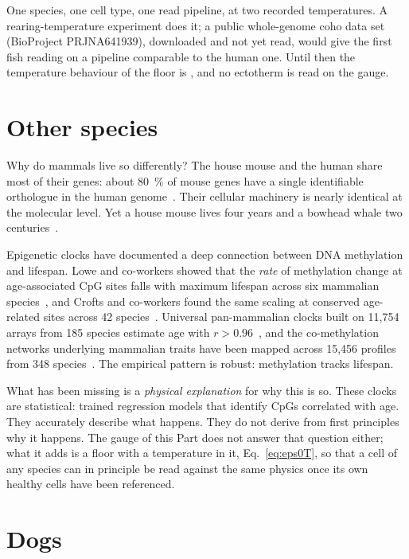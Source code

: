 \begin{keybox}[title=The test that decides]
One species, one cell type, one read pipeline, at two recorded temperatures. A rearing-temperature experiment does it; a
public whole-genome coho data set (BioProject PRJNA641939), downloaded and not yet read, would give the first fish reading on a pipeline comparable to the human one. Until then
the temperature behaviour of the floor is \openprob, and no ectotherm is read on the gauge.
\end{keybox}

\section{Other species}\label{sec:p4_species}

Why do mammals live so differently? The house mouse and the human share most of their genes: about 80~\% of mouse genes
have a single identifiable orthologue in the human genome~\cite{Waterston2002}. Their cellular machinery is nearly identical
at the molecular level. Yet a house mouse lives four years and a bowhead whale two centuries~\cite{Tacutu2018}. \observed

Epigenetic clocks have documented a deep connection between DNA methylation and lifespan. Lowe and co-workers showed that the
\emph{rate} of methylation change at age-associated CpG sites falls with maximum lifespan across six mammalian
species~\cite{Lowe2018}, and Crofts and co-workers found the same scaling at conserved age-related sites across 42
species~\cite{Crofts2024}. Universal pan-mammalian clocks built on 11,754 arrays from 185 species estimate age with
$r>0.96$~\cite{Lu2023}, and the co-methylation networks underlying mammalian traits have been mapped across 15,456 profiles
from 348 species~\cite{Haghani2023}. The empirical pattern is robust: methylation tracks lifespan. \observed{}

What has been missing is a \emph{physical explanation} for why this is so. These clocks are statistical: trained regression
models that identify CpGs correlated with age. They accurately describe what happens. They do not derive from first
principles why it happens. \interp{}
The gauge of this Part does not answer that question either; what it adds is a floor with a temperature in it,
Eq.~\eqref{eq:eps0T}, so that a cell of any species can in principle be read against the same physics once its own healthy
cells have been referenced.

\section{Dogs}

